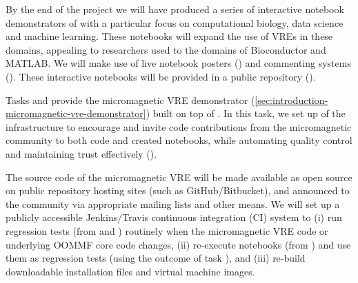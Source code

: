 \begin{workpackage}
\begin{tasklist}
\begin{task}[title=Introduce \TheProject to Researchers and Teachers, id=project-intro,lead=USH,wphases=6-44,PM=20,partners={USO,XFEL}, issue=29]
 By the end of the
  project we will have produced a series of interactive notebook
  demonstrators  of \TheProject with a
  particular focus on computational biology, data science and machine
  learning. These notebooks will expand the use of VREs in these
  domains, appealing to researchers used to the domains of
  Bioconductor and MATLAB. We will make use of live notebook posters
  () and commenting systems
  (). These interactive notebooks
  will be provided in a public repository
  ().
\end{task}

\begin{task}[id=dissemination-of-oommf-nb-virtual-environment,
  title=Open source dissemination of micromagnetic VRE,
  lead=XFEL,PM=4,partners={SR,USH,PS},wphases=28-32,issue=30]
  Tasks  and
   provide the
  micromagnetic VRE demonstrator
  (\ref{sec:introduction-micromagnetic-vre-demonstrator}) built on top
  of \TheProject.  In this task, we set up of the infrastructure
  to encourage
  and invite code contributions from the micromagnetic community to
  both code and created notebooks, while automating quality control
  and maintaining trust effectively ().

  The source code of the micromagnetic VRE will be made available as
  open source on public repository hosting sites (such as
  GitHub/Bitbucket), and announced to the community via appropriate
  mailing lists and other means. We will set up a publicly accessible
  Jenkins/Travis continuous integration (CI) system to (i) run
  regression tests (from
   and
  ) routinely when the
  micromagnetic VRE code or underlying OOMMF core code changes, (ii)
  re-execute notebooks (from
  ) and use them as
  regression tests (using the outcome of task
  ), and (iii) re-build
  downloadable installation files and virtual machine images.


\end{task}


\end{tasklist}
\end{workpackage}

